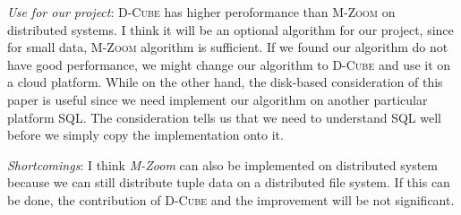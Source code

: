\begin{itemize*}
\item {\em Use for our project}:
      \textsc{D-Cube} has higher peroformance than \textsc{M-Zoom} on distributed systems. I think it will be an optional algorithm for our project, since for small data, \textsc{M-Zoom} algorithm is sufficient. If we found our algorithm do not have good performance, we might change our algorithm to \textsc{D-Cube} and use it on a cloud platform. While on the other hand, the disk-based consideration of this paper is useful since we need implement our algorithm on another particular platform SQL. The consideration tells us that we need to understand SQL well before we simply copy the implementation onto it.\\
      
\item {\em Shortcomings}:
     I think \textit{M-Zoom} can also be implemented on distributed system because we can still distribute tuple data on a distributed file system. If this can be done, the contribution of \textsc{D-Cube} and the improvement will be not significant.
      
\end{itemize*}


